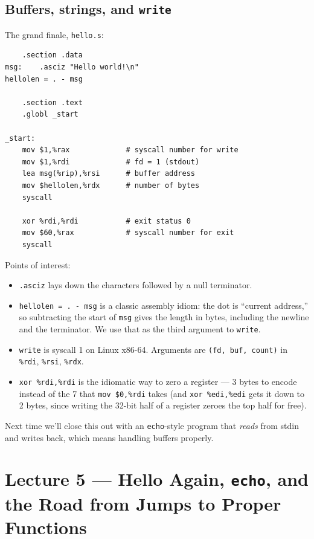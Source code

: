 \documentclass[11pt]{article}
\begin{document}
\subsection*{Buffers, strings, and \texttt{write}}

The grand finale, \texttt{hello.s}:

\begin{lstlisting}
    .section .data
msg:    .asciz "Hello world!\n"
hellolen = . - msg

    .section .text
    .globl _start

_start:
    mov $1,%rax             # syscall number for write
    mov $1,%rdi             # fd = 1 (stdout)
    lea msg(%rip),%rsi      # buffer address
    mov $hellolen,%rdx      # number of bytes
    syscall

    xor %rdi,%rdi           # exit status 0
    mov $60,%rax            # syscall number for exit
    syscall
\end{lstlisting}

Points of interest:
\begin{itemize}
  \item \texttt{.asciz} lays down the characters followed by a null
    terminator.
  \item \texttt{hellolen = . - msg} is a classic assembly idiom: the
    dot is ``current address,'' so subtracting the start of
    \texttt{msg} gives the length in bytes, including the newline and
    the terminator. We use that as the third argument to \texttt{write}.
  \item \texttt{write} is syscall 1 on Linux x86-64. Arguments are
    \texttt{(fd, buf, count)} in \texttt{\%rdi}, \texttt{\%rsi},
    \texttt{\%rdx}.
  \item \texttt{xor \%rdi,\%rdi} is the idiomatic way to zero a
    register --- 3 bytes to encode instead of the 7 that
    \texttt{mov \$0,\%rdi} takes (and \texttt{xor \%edi,\%edi} gets
    it down to 2 bytes, since writing the 32-bit half of a register
    zeroes the top half for free).
\end{itemize}

Next time we'll close this out with an \texttt{echo}-style program
that \emph{reads} from stdin and writes back, which means handling
buffers properly.

\section{Lecture 5 --- Hello Again, \texttt{echo}, and the Road from Jumps to Proper Functions}
\end{document}
